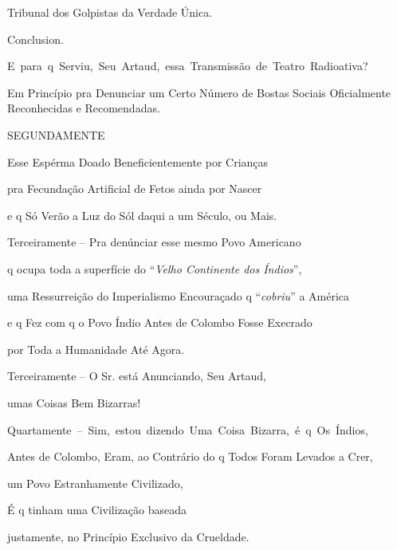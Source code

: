 

Tribunal dos Golpistas da Verdade Única.

Conclusion.


\mbox{E para q Serviu, Seu Artaud, essa Transmissão de Teatro Radioativa?}



Em Princípio pra Denunciar um Certo Número
de Bostas Sociais Oficialmente Reconhecidas e Recomendadas.




SEGUNDAMENTE

Esse Espérma Doado Beneficientemente por Crianças

pra Fecundação Artificial de Fetos ainda por Nascer

e q Só Verão a Luz do Sól daqui a um Século, ou Mais.


Terceiramente -- Pra denúnciar esse mesmo Povo Americano

q ocupa toda a superfície do ``\emph{Velho Continente dos Índios}'',

uma Ressurreição do Imperialismo Encouraçado q ``\emph{cobriu}'' a América

e q Fez com q o Povo Índio Antes de Colombo Fosse Execrado

por Toda a Humanidade Até Agora.


Terceiramente -- O Sr. está Anunciando, Seu Artaud,

umas Coisas Bem Bizarras!


\mbox{Quartamente -- Sim, estou dizendo Uma Coisa Bizarra, é q Os Índios,}

Antes de Colombo, Eram, ao Contrário do q Todos Foram Levados a Crer,

um Povo Estranhamente Civilizado,

É q tinham uma Civilização baseada

justamente, no Princípio Exclusivo da Crueldade.

